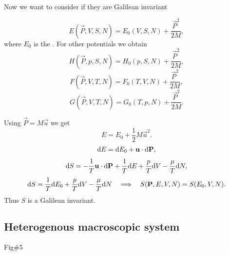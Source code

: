   Now we want to consider if they are Galilean invariant


  \begin{displaymath}
    E(\vec P, V, S, N) = E_0 (V, S, N) + \frac{\vec P^2}{2 M},
  \end{displaymath}
  where $E_0$ is the .
  For other potentials we obtain
  \begin{displaymath}
    H(\vec P, p , S, N) = H_0(p, S, N) + \frac{\vec P^2}{2 M},
  \end{displaymath}
  \begin{displaymath}
    F(\vec P, V, T, N) = F_0(T, V, N) + \frac{\vec P^2}{2 M},
  \end{displaymath}
  \begin{displaymath}
    G(\vec P, V, T, N) = G_0(T, p, N) + \frac{\vec P^2}{2 M}.
  \end{displaymath}
  
  Using $\vec P = M \vec u$ we get
  \begin{displaymath}
    E = E_0 + \frac{1}{2} M \vec u ^2.
  \end{displaymath}
  \begin{displaymath}
    \mathrm{d} E = \mathrm{d} E_0 + \mathbf{u} \cdot \mathrm{d} \mathbf{P},
  \end{displaymath}
  \begin{displaymath}
    \mathrm{d} S = - \frac{1}{T} \mathbf{u} \cdot \mathrm{d} \mathbf{P} + \frac{1}{T} \mathrm{d} E + \frac{p}{T} \mathrm{d} V - \frac{\mu}{T} \mathrm{d} N,
  \end{displaymath}
  \begin{displaymath}
    \mathrm{d} S = \frac{1}{T}\mathrm{d} E_0 + \frac{p}{T} \mathrm{d} V - \frac{\mu}{T} \mathrm{d} N 
    \quad \Longrightarrow \quad S(\mathbf{P} , E , V, N) = S(E_0, V, N).
  \end{displaymath}
  Thus $S$ is a Galilean invariant.

  \subsection{Heterogenous macroscopic system}
  \todo Fig\#5

